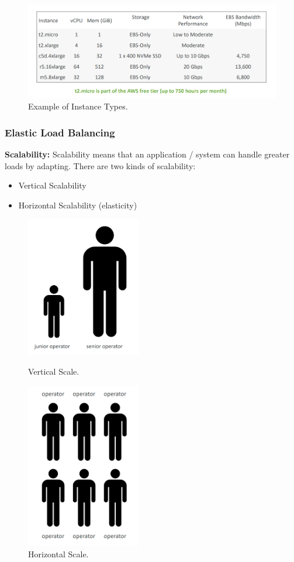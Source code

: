 \documentclass{article}
\begin{document}
\begin{figure}[h]
    \centering
    \includegraphics[width=13cm]{Pictures/Theory/EC2 instance types.png}
    \caption{Example of Instance Types.}
    \label{fig:enter-label}
\end{figure}
\subsubsection{Elastic Load Balancing}
\textbf{Scalability: }  Scalability means that an application / system can handle greater loads by adapting. There are two kinds of scalability:
\begin{itemize}
    \item Vertical Scalability
    \item Horizontal Scalability (elasticity)
\end{itemize}
\begin{figure}[H]
  \centering
  \begin{minipage}[b]{0.4\textwidth}
    \includegraphics[width=5cm]{Pictures/Theory/Vertical scale.png}
    \caption{Vertical Scale.}
  \end{minipage}
  \hfill
  \begin{minipage}[b]{0.4\textwidth}
    \includegraphics[width=5cm]{Pictures/Theory/Horizontal Scale.png}
    \caption{Horizontal Scale.}
  \end{minipage}
\end{figure}
\end{document}
